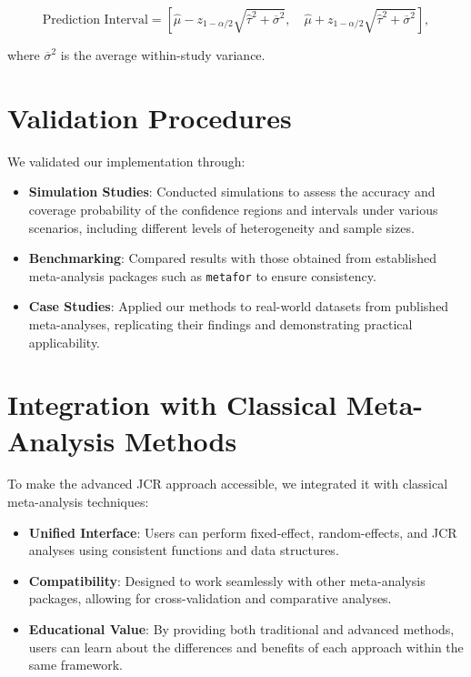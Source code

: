 \documentclass[12pt,a4paper]{report}
\begin{document}
\begin{equation}
\label{eq:prediction_interval}
\text{Prediction Interval} = \left[ \hat{\mu} - z_{1 - \alpha/2} \sqrt{\hat{\tau}^2 + \overline{\sigma}^2}, \quad \hat{\mu} + z_{1 - \alpha/2} \sqrt{\hat{\tau}^2 + \overline{\sigma}^2} \right],
\end{equation}

where $\overline{\sigma}^2$ is the average within-study variance.

\section{Validation Procedures}
\label{sec:validation_procedures}

We validated our implementation through:

\begin{itemize}
    \item \textbf{Simulation Studies}: Conducted simulations to assess the accuracy and coverage probability of the confidence regions and intervals under various scenarios, including different levels of heterogeneity and sample sizes.
    \item \textbf{Benchmarking}: Compared results with those obtained from established meta-analysis packages such as \texttt{metafor} \citep{viechtbauer2010metafor} to ensure consistency.
    \item \textbf{Case Studies}: Applied our methods to real-world datasets from published meta-analyses, replicating their findings and demonstrating practical applicability.
\end{itemize}

\section{Integration with Classical Meta-Analysis Methods}
\label{sec:integration_classical_methods}

To make the advanced JCR approach accessible, we integrated it with classical meta-analysis techniques:

\begin{itemize}
    \item \textbf{Unified Interface}: Users can perform fixed-effect, random-effects, and JCR analyses using consistent functions and data structures.
    \item \textbf{Compatibility}: Designed to work seamlessly with other meta-analysis packages, allowing for cross-validation and comparative analyses.
    \item \textbf{Educational Value}: By providing both traditional and advanced methods, users can learn about the differences and benefits of each approach within the same framework.
\end{itemize}
\end{document}
